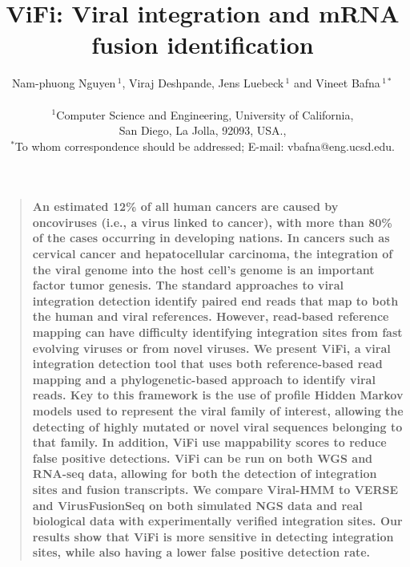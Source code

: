 \documentclass[12pt]{article}
\title{ViFi: Viral integration and mRNA fusion identification}
\author
{Nam-phuong Nguyen\,$^{1}$, Viraj Deshpande, 
Jens Luebeck\,$^{1}$ and Vineet Bafna\,$^{1\ast}$\\
\\
\normalsize{$^{1}$Computer Science and Engineering, University of California,}\\
\normalsize{San Diego, La Jolla, 92093, USA.,}\\
\normalsize{$^\ast$To whom correspondence should be addressed; E-mail:  vbafna@eng.ucsd.edu.}
}
\date{}
\newenvironment{sciabstract}{%
\begin{quote} \bf}
{\end{quote}}
\begin{document}
 


\baselineskip24pt


\maketitle 


\begin{sciabstract}
  An estimated 12\% of all human cancers are caused by oncoviruses (i.e., a virus linked to cancer), with more than 80\% of the cases occurring in developing nations.  In cancers such as cervical cancer and hepatocellular carcinoma, the integration of the viral genome into the host cell's genome is an important factor tumor genesis.  The standard approaches to viral integration detection identify paired end reads that map to both the human and viral references.  However, read-based reference mapping can have difficulty identifying integration sites from fast evolving viruses or from novel viruses.  We present ViFi, a viral integration detection tool that uses both reference-based read mapping and a phylogenetic-based approach to identify viral reads.  Key to this framework is the use of profile Hidden Markov models used to represent the viral family of interest, allowing the detecting of highly mutated or novel viral sequences belonging to that family.  In addition, ViFi use mappability scores to reduce false positive detections.  ViFi can be run on both WGS and RNA-seq data, allowing for both the detection of integration sites and fusion transcripts.  We compare Viral-HMM to VERSE and VirusFusionSeq on both simulated NGS data and real biological data with experimentally verified integration sites.  Our results show that ViFi is more sensitive in detecting integration sites, while also having a lower false positive detection rate.
\end{sciabstract}
\end{document}
